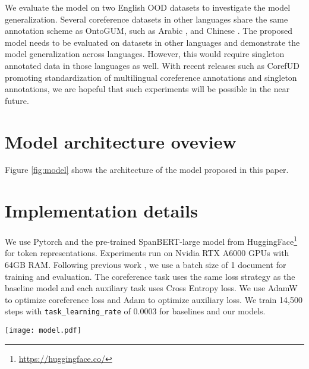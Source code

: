 \documentclass[11pt]{article}
\begin{document}
We evaluate the model on two English OOD datasets to investigate the model generalization. Several coreference datasets in other languages share the same annotation scheme as OntoGUM, such as Arabic \citep{pradhan-etal-2013-towards}, and Chinese \citep{pradhan-etal-2013-towards}. The proposed model needs to be evaluated on datasets in other languages and demonstrate the model generalization across languages. However, this would require singleton annotated data in those languages as well. With recent releases such as CorefUD \cite{nedoluzhko-etal-2022-corefud} promoting standardization of multilingual coreference annotations and singleton annotations, we are hopeful that such experiments will be possible in the near future.




\appendix

\section{Model architecture oveview}
\label{sec:appendix_modelarc}
Figure \ref{fig:model} shows the architecture of the model proposed in this paper.


\section{Implementation details}
\label{sec:appendix_implementation}
We use Pytorch and the pre-trained SpanBERT-large \citep{joshi-etal-2020-spanbert} model from HuggingFace\footnote{\url{https://huggingface.co/}} for token representations. Experiments run on Nvidia RTX A6000 GPUs with 64GB RAM. Following previous work \citep{lee-etal-2018-higher, joshi-etal-2020-spanbert}, we use a batch size of 1 document for training and evaluation. The coreference task uses the same loss strategy as the baseline model \citep{joshi-etal-2020-spanbert} and each auxiliary task uses Cross Entropy loss. We use AdamW to optimize coreference loss and Adam to optimize auxiliary loss. We train 14,500 steps with \texttt{task\_learning\_rate} of 0.0003 for baselines and our models.

\begin{figure*}[t!hb]
    \centering
    \texttt{[image: model.pdf]}
    \caption{An overview of the proposed MTL model architecture. Only selected spans with high mention scores (in blue) are considered in the three auxiliary tasks.} \label{fig:model}
\end{figure*}
\end{document}
